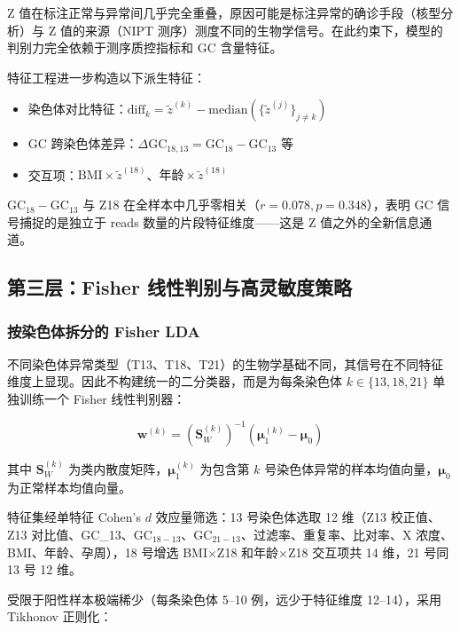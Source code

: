 \documentclass{mcm-paper}
\begin{document}
Z 值在标注正常与异常间几乎完全重叠，原因可能是标注异常的确诊手段（核型分析）与 Z 值的来源（NIPT 测序）测度不同的生物学信号。在此约束下，模型的判别力完全依赖于测序质控指标和 GC 含量特征。

特征工程进一步构造以下派生特征：
\begin{itemize}
    \item 染色体对比特征：$\text{diff}_k = \tilde{z}^{(k)} - \text{median}(\{\tilde{z}^{(j)}\}_{j \neq k})$
    \item GC 跨染色体差异：$\Delta\text{GC}_{18,13} = \text{GC}_{18} - \text{GC}_{13}$ 等
    \item 交互项：$\text{BMI} \times \tilde{z}^{(18)}$、$\text{年龄} \times \tilde{z}^{(18)}$
\end{itemize}

GC$_{18}-$GC$_{13}$ 与 Z18 在全样本中几乎零相关（$r=0.078, p=0.348$），表明 GC 信号捕捉的是独立于 reads 数量的片段特征维度——这是 Z 值之外的全新信息通道。

\subsection{第三层：Fisher 线性判别与高灵敏度策略}

\subsubsection{按染色体拆分的 Fisher LDA}

不同染色体异常类型（T13、T18、T21）的生物学基础不同，其信号在不同特征维度上显现。因此不构建统一的二分类器，而是为每条染色体 $k \in \{13,18,21\}$ 单独训练一个 Fisher 线性判别器：

\begin{equation}
\mathbf{w}^{(k)} = (\mathbf{S}_W^{(k)})^{-1} (\boldsymbol{\mu}_1^{(k)} - \boldsymbol{\mu}_0)
\end{equation}

其中 $\mathbf{S}_W^{(k)}$ 为类内散度矩阵，$\boldsymbol{\mu}_1^{(k)}$ 为包含第 $k$ 号染色体异常的样本均值向量，$\boldsymbol{\mu}_0$ 为正常样本均值向量。

特征集经单特征 Cohen's $d$ 效应量筛选：13 号染色体选取 12 维（Z13 校正值、Z13 对比值、GC\_13、GC$_{18-13}$、GC$_{21-13}$、过滤率、重复率、比对率、X 浓度、BMI、年龄、孕周），18 号增选 BMI$\times$Z18 和年龄$\times$Z18 交互项共 14 维，21 号同 13 号 12 维。

受限于阳性样本极端稀少（每条染色体 5--10 例，远少于特征维度 12--14），采用 Tikhonov 正则化：
\end{document}
